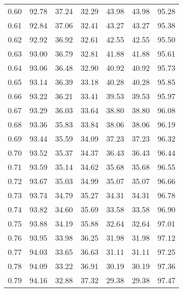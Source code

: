 \begin{tabular}{|c|c|c|c|c|c|c|}
      0.60 &     92.78 &     37.24 &      32.29 &   43.98 &      43.98 &         95.28 \\
      0.61 &     92.84 &     37.06 &      32.41 &   43.27 &      43.27 &         95.38 \\
      0.62 &     92.92 &     36.92 &      32.61 &   42.55 &      42.55 &         95.50 \\
      0.63 &     93.00 &     36.79 &      32.81 &   41.88 &      41.88 &         95.61 \\
      0.64 &     93.06 &     36.48 &      32.90 &   40.92 &      40.92 &         95.73 \\
      0.65 &     93.14 &     36.39 &      33.18 &   40.28 &      40.28 &         95.85 \\
      0.66 &     93.22 &     36.21 &      33.41 &   39.53 &      39.53 &         95.97 \\
      0.67 &     93.29 &     36.03 &      33.64 &   38.80 &      38.80 &         96.08 \\
      0.68 &     93.36 &     35.83 &      33.84 &   38.06 &      38.06 &         96.19 \\
      0.69 &     93.44 &     35.59 &      34.09 &   37.23 &      37.23 &         96.32 \\
      0.70 &     93.52 &     35.37 &      34.37 &   36.43 &      36.43 &         96.44 \\
      0.71 &     93.59 &     35.14 &      34.62 &   35.68 &      35.68 &         96.55 \\
      0.72 &     93.67 &     35.03 &      34.99 &   35.07 &      35.07 &         96.66 \\
      0.73 &     93.74 &     34.79 &      35.27 &   34.31 &      34.31 &         96.78 \\
      0.74 &     93.82 &     34.60 &      35.69 &   33.58 &      33.58 &         96.90 \\
      0.75 &     93.88 &     34.19 &      35.88 &   32.64 &      32.64 &         97.01 \\
      0.76 &     93.95 &     33.98 &      36.25 &   31.98 &      31.98 &         97.12 \\
      0.77 &     94.03 &     33.65 &      36.63 &   31.11 &      31.11 &         97.25 \\
      0.78 &     94.09 &     33.22 &      36.91 &   30.19 &      30.19 &         97.36 \\
      0.79 &     94.16 &     32.88 &      37.32 &   29.38 &      29.38 &         97.47 \\

\end{tabular}

